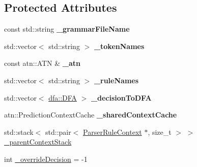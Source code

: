 \subsection*{Protected Attributes}
\begin{DoxyCompactItemize}
\item 
\mbox{\label{classantlr4_1_1ParserInterpreter_a914bed1028d39c8ba2205a5fbdfef1d6}} 
const std\+::string {\bfseries \+\_\+grammar\+File\+Name}
\item 
\mbox{\label{classantlr4_1_1ParserInterpreter_ae20d82145b4b89b7ac7226254680de6a}} 
std\+::vector$<$ std\+::string $>$ {\bfseries \+\_\+token\+Names}
\item 
\mbox{\label{classantlr4_1_1ParserInterpreter_a62b9e4f6cea861ca20e9c78e2f2e39b1}} 
const atn\+::\+A\+TN \& {\bfseries \+\_\+atn}
\item 
\mbox{\label{classantlr4_1_1ParserInterpreter_af92b2be8ed21eae5d60e1052f088381f}} 
std\+::vector$<$ std\+::string $>$ {\bfseries \+\_\+rule\+Names}
\item 
\mbox{\label{classantlr4_1_1ParserInterpreter_a4261d4f61c8cea8b9a5f2a452cbdd6e1}} 
std\+::vector$<$ \hyperlink{classantlr4_1_1dfa_1_1DFA}{dfa\+::\+D\+FA} $>$ {\bfseries \+\_\+decision\+To\+D\+FA}
\item 
\mbox{\label{classantlr4_1_1ParserInterpreter_a68efbb2f03878252767f3fc94c2d3444}} 
atn\+::\+Prediction\+Context\+Cache {\bfseries \+\_\+shared\+Context\+Cache}
\item 
std\+::stack$<$ std\+::pair$<$ \hyperlink{classantlr4_1_1ParserRuleContext}{Parser\+Rule\+Context} $\ast$, size\+\_\+t $>$ $>$ \hyperlink{classantlr4_1_1ParserInterpreter_abfa9731e87e83124dd86ab5d001049d1}{\+\_\+parent\+Context\+Stack}
\item 
int \hyperlink{classantlr4_1_1ParserInterpreter_a2e21041c627adc5d8a21dd9e3f544e34}{\+\_\+override\+Decision} = -\/1
\item 
\mbox{\label{classantlr4_1_1ParserInterpreter_a6f0707e3a02df052f8b713aef403e093}} 

\end{DoxyCompactItemize}
